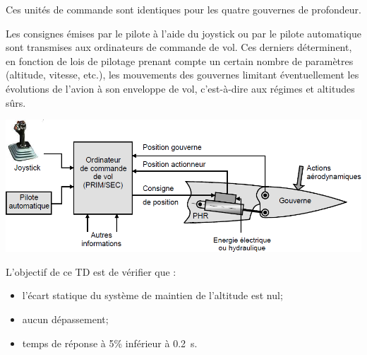 \documentclass[10pt,fleqn]{article} %
\begin{document}
\begin{multicols}{2}
Ces unités de commande sont identiques pour les quatre gouvernes de profondeur.

%

Les consignes émises par le pilote à l'aide du joystick ou par le pilote automatique sont transmises aux ordinateurs de commande de vol. Ces derniers déterminent, en fonction de lois de pilotage prenant compte un certain nombre de paramètres (altitude, vitesse, etc.), les mouvements des gouvernes limitant éventuellement les évolutions de l'avion à son enveloppe de vol, c'est-à-dire aux régimes et altitudes sûrs.


\begin{center}
\includegraphics[width=.9\linewidth]{images/img4}
\end{center}

\fi


\begin{obj}
L'objectif de ce TD est de vérifier que :
\begin{itemize}
\item l'écart statique du système de maintien de l'altitude est nul;
\item aucun dépassement;
\item temps de réponse à 5\% inférieur à \SI{0,2}{s}.
\end{itemize}



\end{obj}
\end{multicols}
\end{document}
